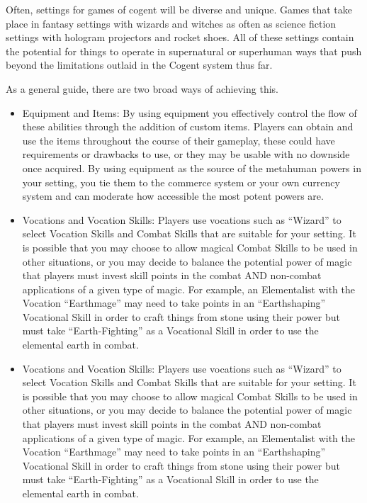 Often, settings for games of cogent will be diverse and unique. Games that take place in fantasy settings with wizards and witches as often as science fiction settings with hologram projectors and rocket shoes. All of these settings contain the potential for things to operate in supernatural or superhuman ways that push beyond the limitations outlaid in the Cogent system thus far.

As a general guide, there are two broad ways of achieving this.

\begin{itemize}
    \item Equipment and Items: By using equipment you effectively control the flow of these abilities through the addition of custom items. Players can obtain and use the items throughout the course of their gameplay, these could have requirements or drawbacks to use, or they may be usable with no downside once acquired. By using equipment as the source of the metahuman powers in your setting, you tie them to the commerce system or your own currency system and can moderate how accessible the most potent powers are.
    \item Vocations and Vocation Skills: Players use vocations such as “Wizard” to select Vocation Skills and Combat Skills that are suitable for your setting. It is possible that you may choose to allow magical Combat Skills to be used in other situations, or you may decide to balance the potential power of magic that players must invest skill points in the combat AND non-combat applications of a given type of magic. For example, an Elementalist with the Vocation “Earthmage” may need to take points in an “Earthshaping” Vocational Skill in order to craft things from stone using their power but must take “Earth-Fighting” as a Vocational Skill in order to use the elemental earth in combat.
    \item Vocations and Vocation Skills: Players use vocations such as “Wizard” to select Vocation Skills and Combat Skills that are suitable for your setting. It is possible that you may choose to allow magical Combat Skills to be used in other situations, or you may decide to balance the potential power of magic that players must invest skill points in the combat AND non-combat applications of a given type of magic. For example, an Elementalist with the Vocation “Earthmage” may need to take points in an “Earthshaping” Vocational Skill in order to craft things from stone using their power but must take “Earth-Fighting” as a Vocational Skill in order to use the elemental earth in combat.
\end{itemize}

